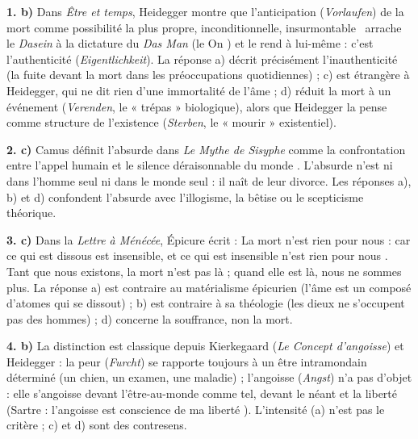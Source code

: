 \documentclass[11pt]{article}
\begin{document}
\begin{corrige}
\textbf{1. b)} Dans \emph{Être et temps}, Heidegger montre que l'anticipation (\emph{Vorlaufen}) de la mort comme \guillemotleft possibilité la plus propre, inconditionnelle, insurmontable \guillemotright\ arrache le \emph{Dasein} à la dictature du \emph{Das Man} (le \guillemotleft On \guillemotright) et le rend à lui-même : c'est l'authenticité (\emph{Eigentlichkeit}). La réponse a) décrit précisément l'inauthenticité (la fuite devant la mort dans les préoccupations quotidiennes) ; c) est étrangère à Heidegger, qui ne dit rien d'une immortalité de l'âme ; d) réduit la mort à un événement (\emph{Verenden}, le « trépas » biologique), alors que Heidegger la pense comme structure de l'existence (\emph{Sterben}, le « mourir » existentiel).

\textbf{2. c)} Camus définit l'absurde dans \emph{Le Mythe de Sisyphe} comme la confrontation entre \guillemotleft l'appel humain et le silence déraisonnable du monde \guillemotright. L'absurde n'est ni dans l'homme seul ni dans le monde seul : il naît de leur divorce. Les réponses a), b) et d) confondent l'absurde avec l'illogisme, la bêtise ou le scepticisme théorique.

\textbf{3. c)} Dans la \emph{Lettre à Ménécée}, Épicure écrit : \guillemotleft La mort n'est rien pour nous : car ce qui est dissous est insensible, et ce qui est insensible n'est rien pour nous \guillemotright. Tant que nous existons, la mort n'est pas là ; quand elle est là, nous ne sommes plus. La réponse a) est contraire au matérialisme épicurien (l'âme est un composé d'atomes qui se dissout) ; b) est contraire à sa théologie (les dieux ne s'occupent pas des hommes) ; d) concerne la souffrance, non la mort.

\textbf{4. b)} La distinction est classique depuis Kierkegaard (\emph{Le Concept d'angoisse}) et Heidegger : la peur (\emph{Furcht}) se rapporte toujours à un être intramondain déterminé (un chien, un examen, une maladie) ; l'angoisse (\emph{Angst}) n'a pas d'objet : elle s'angoisse devant l'être-au-monde comme tel, devant le néant et la liberté (Sartre : l'angoisse est \guillemotleft conscience de ma liberté \guillemotright). L'intensité (a) n'est pas le critère ; c) et d) sont des contresens.
\end{corrige}
\end{document}
